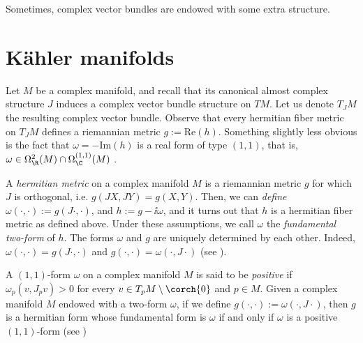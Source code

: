Sometimes, complex vector bundles are endowed with some extra structure.



\section{Kähler manifolds}
Let \(M\) be a complex manifold, and recall that its canonical almost complex structure \(J\) induces a complex vector bundle structure on \(TM\). Let us denote \(T_JM\) the resulting complex vector bundle. Observe that every hermitian fiber metric on \(T_JM\) defines a riemannian metric \(g:=\mathrm{Re}(h)\). Something slightly less obvious is the fact that \(\omega=-\mathrm{Im}(h)\) is a real form of type \((1,1)\), that is, \(\omega \in \Omega_\R^2(M) \cap \Omega_\C^{(1,1)}(M)\) \parencite[Lemma 8.2]{lee_introCM}.    

A \textit{hermitian metric} on a complex manifold \(M\) is a riemannian metric \(g\) for which \(J\) is orthogonal, i.e. \(g(JX, JY)=g(X,Y)\). Then, we can \textit{define} \(\omega(\cdot, \cdot):=g(J\cdot, \cdot)\), and \(h:=g-\ii \omega\), and it turns out that \(h\) is a hermitian fiber metric as defined above. Under these assumptions, we call \(\omega\) the \textit{fundamental two-form} of \(h\). The forms \(\omega\) and \(g\) are uniquely determined by each other. Indeed, \(\omega(\cdot, \cdot)=g(J \cdot, \cdot)\) and \(g(\cdot, \cdot)=\omega(\cdot, J \cdot)\) (see \parencite[lemma 8.3 and lemma 8.7]{lee_introCM}). 

A \((1,1)\)-form \(\omega\) on a complex manifold \(M\) is said to be \textit{positive} if \(\omega_p(v,J_pv)>0\) for every \(v \in T_pM \setminus \corch{0}\) and \(p \in M\). Given a complex manifold \(M\) endowed with a two-form \(\omega\), if we define \(g(\cdot, \cdot):=\omega(\cdot, J \cdot)\), then \(g\) is a hermitian form whose fundamental form is \(\omega\) if and only if \(\omega\) is a positive \((1,1)\)-form (see \parencite[Prop. 8.9]{lee_introCM})

